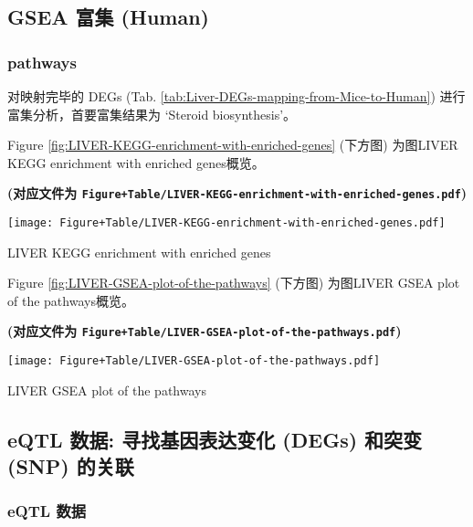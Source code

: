 \documentclass[
]{article}
\begin{document}
\hypertarget{gsea-ux5bccux96c6-human}{%
\subsection{GSEA 富集 (Human)}\label{gsea-ux5bccux96c6-human}}

\hypertarget{pathways}{%
\subsubsection{pathways}\label{pathways}}

对映射完毕的 DEGs (Tab. \ref{tab:Liver-DEGs-mapping-from-Mice-to-Human}) 进行富集分析，首要富集结果为 `Steroid biosynthesis'。

Figure \ref{fig:LIVER-KEGG-enrichment-with-enriched-genes} (下方图) 为图LIVER KEGG enrichment with enriched genes概览。

\textbf{(对应文件为 \texttt{Figure+Table/LIVER-KEGG-enrichment-with-enriched-genes.pdf})}

\def\@captype{figure}
\begin{center}
\texttt{[image: Figure+Table/LIVER-KEGG-enrichment-with-enriched-genes.pdf]}
\caption{LIVER KEGG enrichment with enriched genes}\label{fig:LIVER-KEGG-enrichment-with-enriched-genes}
\end{center}

Figure \ref{fig:LIVER-GSEA-plot-of-the-pathways} (下方图) 为图LIVER GSEA plot of the pathways概览。

\textbf{(对应文件为 \texttt{Figure+Table/LIVER-GSEA-plot-of-the-pathways.pdf})}

\def\@captype{figure}
\begin{center}
\texttt{[image: Figure+Table/LIVER-GSEA-plot-of-the-pathways.pdf]}
\caption{LIVER GSEA plot of the pathways}\label{fig:LIVER-GSEA-plot-of-the-pathways}
\end{center}

\hypertarget{eqtl-ux6570ux636e-ux5bfbux627eux57faux56e0ux8868ux8fbeux53d8ux5316-degs-ux548cux7a81ux53d8-snp-ux7684ux5173ux8054}{%
\subsection{eQTL 数据: 寻找基因表达变化 (DEGs) 和突变 (SNP) 的关联}\label{eqtl-ux6570ux636e-ux5bfbux627eux57faux56e0ux8868ux8fbeux53d8ux5316-degs-ux548cux7a81ux53d8-snp-ux7684ux5173ux8054}}

\hypertarget{eqtl-ux6570ux636e}{%
\subsubsection{eQTL 数据}\label{eqtl-ux6570ux636e}}
\end{document}
